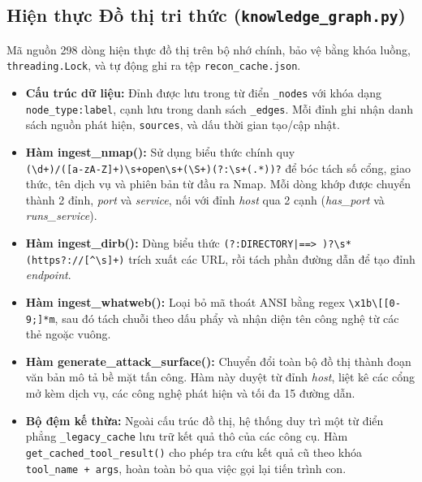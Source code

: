 \subsection{Hiện thực Đồ thị tri thức (\texttt{knowledge\_graph.py})}
Mã nguồn 298 dòng hiện thực đồ thị trên bộ nhớ chính, bảo vệ bằng khóa luồng, \texttt{threading.Lock}, và tự động ghi ra tệp \texttt{recon\_cache.json}.
\begin{itemize}
    \item \textbf{Cấu trúc dữ liệu:} Đỉnh được lưu trong từ điển \texttt{\_nodes} với khóa dạng \texttt{node\_type:label}, cạnh lưu trong danh sách \texttt{\_edges}. Mỗi đỉnh ghi nhận danh sách nguồn phát hiện, \texttt{sources}, và dấu thời gian tạo/cập nhật.
    \item \textbf{Hàm ingest\_nmap():} Sử dụng biểu thức chính quy\\ \texttt{(\textbackslash d+)/([a-zA-Z]+)\textbackslash s+open\textbackslash s+(\textbackslash S+)(?:\textbackslash s+(.*))?} để bóc tách số cổng, giao thức, tên dịch vụ và phiên bản từ đầu ra Nmap. Mỗi dòng khớp được chuyển thành 2 đỉnh, \textit{port} và \textit{service}, nối với đỉnh \textit{host} qua 2 cạnh (\textit{has\_port} và \textit{runs\_service}).
    \item \textbf{Hàm ingest\_dirb():} Dùng biểu thức \texttt{(?:DIRECTORY|==> )?\textbackslash s*(https?://[\textasciicircum\textbackslash s]+)} trích xuất các URL, rồi tách phần đường dẫn để tạo đỉnh \textit{endpoint}.
    \item \textbf{Hàm ingest\_whatweb():} Loại bỏ mã thoát ANSI bằng regex \texttt{\textbackslash x1b\textbackslash[[0-9;]*m}, sau đó tách chuỗi theo dấu phẩy và nhận diện tên công nghệ từ các thẻ ngoặc vuông.
    \item \textbf{Hàm generate\_attack\_surface():} Chuyển đổi toàn bộ đồ thị thành đoạn văn bản mô tả bề mặt tấn công. Hàm này duyệt từ đỉnh \textit{host}, liệt kê các cổng mở kèm dịch vụ, các công nghệ phát hiện và tối đa 15 đường dẫn.
    \item \textbf{Bộ đệm kế thừa:} Ngoài cấu trúc đồ thị, hệ thống duy trì một từ điển phẳng \texttt{\_legacy\_cache} lưu trữ kết quả thô của các công cụ. Hàm \texttt{get\_cached\_tool\_result()} cho phép tra cứu kết quả cũ theo khóa \texttt{tool\_name + args}, hoàn toàn bỏ qua việc gọi lại tiến trình con.
\end{itemize}

